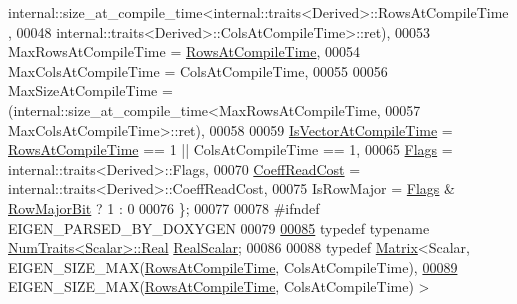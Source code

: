 \begin{DoxyCode}
      internal::size\_at\_compile\_time<internal::traits<Derived>::RowsAtCompileTime,
00048         internal::traits<Derived>::ColsAtCompileTime>::ret),
00053         MaxRowsAtCompileTime = \hyperlink{class_eigen_1_1_skyline_matrix_base_a811ba3961cb927ae5fa84ed278ebceeaa22b71b821112b0ccf61b7317b9ac4cf4}{RowsAtCompileTime},
00054         MaxColsAtCompileTime = ColsAtCompileTime,
00055 
00056         MaxSizeAtCompileTime = (internal::size\_at\_compile\_time<MaxRowsAtCompileTime,
00057         MaxColsAtCompileTime>::ret),
00058 
00059         \hyperlink{class_eigen_1_1_skyline_matrix_base_a811ba3961cb927ae5fa84ed278ebceeaaee4b494f83cfc99369a8364192c33f81}{IsVectorAtCompileTime} = \hyperlink{class_eigen_1_1_skyline_matrix_base_a811ba3961cb927ae5fa84ed278ebceeaa22b71b821112b0ccf61b7317b9ac4cf4}{RowsAtCompileTime} == 1 || 
      ColsAtCompileTime == 1,
00065         \hyperlink{class_eigen_1_1_skyline_matrix_base_a811ba3961cb927ae5fa84ed278ebceeaa206a06da6112137d014c4ff4f199f546}{Flags} = internal::traits<Derived>::Flags,
00070         \hyperlink{class_eigen_1_1_skyline_matrix_base_a811ba3961cb927ae5fa84ed278ebceeaa2f2f2c74314a961757ff965e3b7df794}{CoeffReadCost} = internal::traits<Derived>::CoeffReadCost,
00075         IsRowMajor = \hyperlink{class_eigen_1_1_skyline_matrix_base_a811ba3961cb927ae5fa84ed278ebceeaa206a06da6112137d014c4ff4f199f546}{Flags} & \hyperlink{group__flags_gae4f56c2a60bbe4bd2e44c5b19cbe8762}{RowMajorBit} ? 1 : 0
00076     \};
00077 
00078 \textcolor{preprocessor}{#ifndef EIGEN\_PARSED\_BY\_DOXYGEN}
00079 
\hyperlink{class_eigen_1_1_skyline_matrix_base_a24c532ab7e339b956a637a4a968e1565}{00085}     \textcolor{keyword}{typedef} \textcolor{keyword}{typename} \hyperlink{group___core___module_struct_eigen_1_1_num_traits}{NumTraits<Scalar>::Real} \hyperlink{class_eigen_1_1_skyline_matrix_base_a24c532ab7e339b956a637a4a968e1565}{RealScalar};
00086 
00088     \textcolor{keyword}{typedef} \hyperlink{group___core___module_class_eigen_1_1_matrix}{Matrix}<Scalar, EIGEN\_SIZE\_MAX(\hyperlink{class_eigen_1_1_skyline_matrix_base_a811ba3961cb927ae5fa84ed278ebceeaa22b71b821112b0ccf61b7317b9ac4cf4}{RowsAtCompileTime}, ColsAtCompileTime),
\hyperlink{class_eigen_1_1_skyline_matrix_base_a2cc6375aec33f8ed497d1729f8888899}{00089}                            EIGEN\_SIZE\_MAX(\hyperlink{class_eigen_1_1_skyline_matrix_base_a811ba3961cb927ae5fa84ed278ebceeaa22b71b821112b0ccf61b7317b9ac4cf4}{RowsAtCompileTime}, ColsAtCompileTime) > 

\end{DoxyCode}
